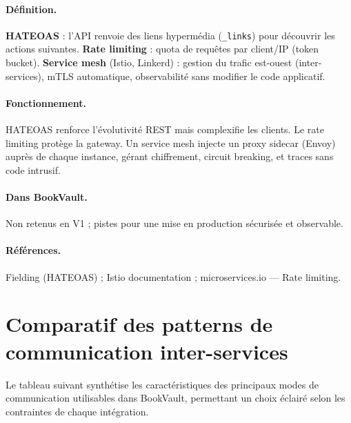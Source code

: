 \documentclass[12pt,a4paper]{report}
\begin{document}
\paragraph{Définition.} \textbf{HATEOAS} : l'API renvoie des liens hypermédia (\texttt{\_links}) pour découvrir les actions suivantes. \textbf{Rate limiting} : quota de requêtes par client/IP (token bucket). \textbf{Service mesh} (Istio, Linkerd) : gestion du trafic est-ouest (inter-services), mTLS automatique, observabilité sans modifier le code applicatif.\par

\paragraph{Fonctionnement.} HATEOAS renforce l'évolutivité REST mais complexifie les clients. Le rate limiting protège la gateway. Un service mesh injecte un proxy sidecar (Envoy) auprès de chaque instance, gérant chiffrement, circuit breaking, et traces sans code intrusif.\par

\paragraph{Dans BookVault.} Non retenus en V1 ; pistes pour une mise en production sécurisée et observable.\par

\paragraph{Références.} Fielding (HATEOAS) ; Istio documentation ; microservices.io — Rate limiting.\par


\section{Comparatif des patterns de communication inter-services}

Le tableau suivant synthétise les caractéristiques des principaux modes de communication utilisables dans BookVault, permettant un choix éclairé selon les contraintes de chaque intégration.
\end{document}
